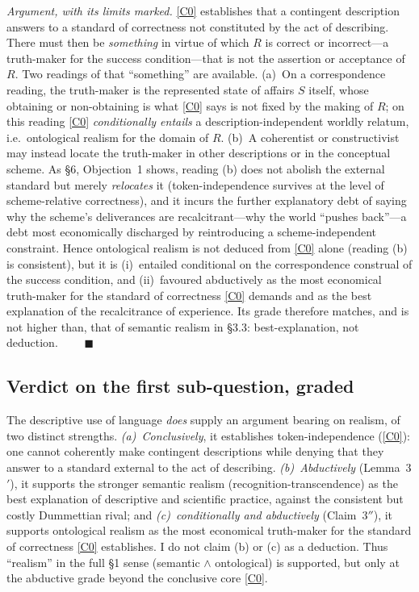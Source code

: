 \documentclass[12pt]{article}
\begin{document}
\noindent\emph{Argument, with its limits marked.} \ref{C0} establishes
that a contingent description answers to a standard of correctness not
constituted by the act of describing. There must then be \emph{something}
in virtue of which $R$ is correct or incorrect---a truth-maker for the
success condition---that is not the assertion or acceptance of $R$. Two
readings of that ``something'' are available. (a)~On a correspondence
reading, the truth-maker is the represented state of affairs $S$ itself,
whose obtaining or non-obtaining is what \ref{C0} says is not fixed by the
making of $R$; on this reading \ref{C0} \emph{conditionally entails} a
description-independent worldly relatum, i.e.\ ontological realism for the
domain of $R$. (b)~A coherentist or constructivist may instead locate the
truth-maker in other descriptions or in the conceptual scheme. As \S6,
Objection~1 shows, reading (b) does not abolish the external standard but
merely \emph{relocates} it (token-independence survives at the level of
scheme-relative correctness), and it incurs the further explanatory debt
of saying why the scheme's deliverances are recalcitrant---why the world
``pushes back''---a debt most economically discharged by reintroducing a
scheme-independent constraint. Hence ontological realism is not deduced
from \ref{C0} alone (reading (b) is consistent), but it is (i)~entailed
conditional on the correspondence construal of the success condition, and
(ii)~favoured abductively as the most economical truth-maker for the
standard of correctness \ref{C0} demands and as the best explanation of
the recalcitrance of experience. Its grade therefore matches, and is not
higher than, that of semantic realism in \S3.3: best-explanation, not
deduction. $\qquad\blacksquare$

\subsection{Verdict on the first sub-question, graded}

\begin{description}[leftmargin=1.6em,style=nextline]
\item[Verdict on realism.] The descriptive use of language \emph{does}
supply an argument bearing on realism, of two distinct strengths.
\emph{(a)~Conclusively}, it establishes token-independence (\ref{C0}): one
cannot coherently make contingent descriptions while denying that they
answer to a standard external to the act of describing. \emph{(b)~Abductively}
(Lemma~3$'$), it supports the stronger semantic realism
(recognition-transcendence) as the best explanation of descriptive and
scientific practice, against the consistent but costly Dummettian rival;
and \emph{(c)~conditionally and abductively} (Claim~3$''$), it supports
ontological realism as the most economical truth-maker for the standard of
correctness \ref{C0} establishes. I do not claim (b) or (c) as a
deduction. Thus ``realism'' in the full \S1 sense (semantic
$\wedge$ ontological) is supported, but only at the abductive grade beyond
the conclusive core \ref{C0}.
\end{description}
\end{document}
